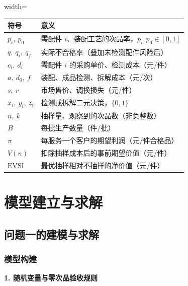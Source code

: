 \documentclass[withoutpreface,bwprint]{cumcmthesis}
\begin{document}
\begin{center}
\small
\begin{adjustbox}{width=\textwidth}
\begin{tabular}{>{\centering\arraybackslash}p{3.2cm}>{\centering\arraybackslash}p{10cm}}
    \toprule[1.5pt]
    \textbf{符号} & \textbf{意义} \\ \midrule[1pt]
    $p_i,\ p_0$   & 零配件 $i$、装配工艺的次品率，$p_i, p_0 \in [0,1]$ \\
    $q,\ q_i,\ q_f$ & 实际不合格率（叠加未检测配件风险后） \\
    $c_i,\ d_i$   & 零配件 $i$ 的采购单价、检测成本（元/件） \\
    $a,\ d_0,\ f$ & 装配、成品检测、拆解成本（元/次） \\
    $s,\ r$       & 市场售价、调换损失（元/件） \\
    $x_i,\ y_i,\ z_i$ & 检测或拆解二元决策，$\{0,1\}$ \\
    $n,\ k$       & 抽样量、观察到的次品数（非负整数） \\
    $B$           & 每批生产数量（件/批） \\
    $\pi$         & 每服务一个客户的期望利润（元/件合格品） \\
    $V(n)$        & 扣除抽样成本后的事前期望价值（元/件） \\
    $\mathrm{EVSI}$ & 最优抽样相对不抽样的净价值（元/件） \\
    \bottomrule[1.5pt]
\end{tabular}
\end{adjustbox}
\end{center}

\section{模型建立与求解}

\subsection{问题一的建模与求解}
\label{sec:q1}

\subsubsection{模型构建}

\textbf{1. 随机变量与零次品验收规则}
\end{document}
